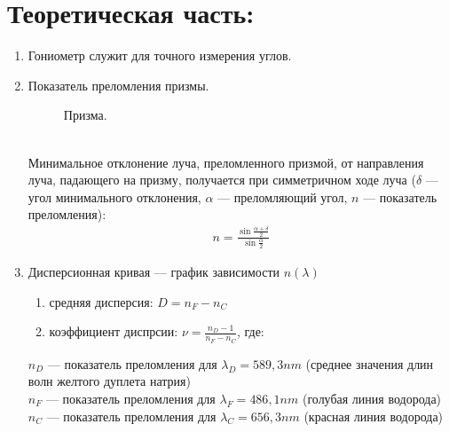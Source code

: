 \section*{Теоретическая часть:}
\begin{enumerate}
    \item Гониометр служит для точного измерения углов.  
    
    \item Показатель преломления призмы. \\
    \begin{figure}[h!]
        \noindent{}
        \caption{Призма.}
    \end{figure} \\
    Минимальное отклонение луча, преломленного призмой, от направления луча, падающего на призму, получается при симметричном ходе луча
    ($\delta$ --- угол минимального отклонения, $\alpha$ --- преломляющий угол, $n$ --- показатель преломления): \\
    \begin{align}
        n = \frac{\sin{\frac{\alpha + \delta}{2}}}{\sin{\frac{\alpha}{2}}}
    \end{align} 
    
    \item Дисперсионная кривая --- график зависимости $n(\lambda)$ \\
        \begin{enumerate}
            \item средняя дисперсия: $D = n_F - n_C$
            \item коэффициент диспрсии: $\nu = \frac{n_D - 1}{n_F - n_C}$, где:
        \end{enumerate}
    $n_D$ --- показатель преломления для $\lambda_D = 589,3nm$ (среднее значения длин волн желтого дуплета натрия) \\
    $n_F$ --- показатель преломления для $\lambda_F = 486,1nm$ (голубая линия водорода) \\
    $n_C$ --- показатель преломления для $\lambda_C = 656,3nm$ (красная линия водорода) \\
    

\end{enumerate}
